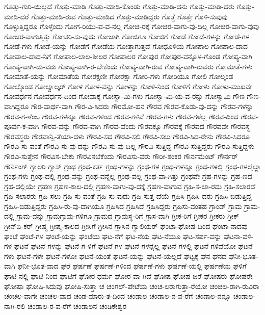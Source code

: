 {ಗೊತ್ತು-ಗುರಿ-ಯಿಲ್ಲದೆ
ಗೊತ್ತು-ಮಾಡಿ
ಗೊತ್ತು-ಮಾಡಿ-ಕೊಂಡು
ಗೊತ್ತು-ಮಾಡಿ-ದನು
ಗೊತ್ತು-ಮಾಡಿ-ದರು
ಗೊತ್ತು-ಮಾಡಿ-ದರೆ
ಗೊತ್ತು-ಮಾಡಿ-ರುವ
ಗೊತ್ತು-ಮಾಡಿದ
ಗೊತ್ತು-ಮಾಡಿದ್ದರು
ಗೊತ್ತೆ
ಗೊತ್ತೇ
ಗೊಳಿ-ಸುವುವು
ಗೊಳ್ಳುತ್ತಿದ್ದರೂ
ಗೊಳ್ಳೆಂದು
ಗೋಗ-ರಿಯು-ವ-ವ-ನಲ್ಲ
ಗೋಚ-ರಕ್ಕೆ
ಗೋಚರ-ವಾಗು-ವು-ದಿಲ್ಲ
ಗೋಚರ-ವಾಗು-ವುವು
ಗೋಚರ-ವಾಗುತ್ತಿತ್ತು
ಗೋಚರಿ-ಸು-ವುದು
ಗೋಜಾಗಿ
ಗೋಜಿಗೂ
ಗೋಜಿಗೆ
ಗೋಡೆ
ಗೋಡೆ-ಗಳನ್ನು
ಗೋಡೆ-ಗಳ
ಗೋಡೆ-ಗಳು
ಗೋಡೆ-ಯನ್ನು
ಗೋಡೆಗೆ
ಗೋಡೆಯ
ಗೋತ್ತಾಗುತ್ತದೆ
ಗೋಧೂಳಿಯ
ಗೋಪಾಲ
ಗೋಪಾಲ-ದಾದ
ಗೋಪಾಲ-ದಾದ-ನಿಗೆ
ಗೋಪಾಲ-ಲಾಲ-ಶೀಲರ
ಗೋಪಾಲರ
ಗೋಪುರ
ಗೋಪುರ-ವನ್ನೊಳ-ಗೊಂಡ
ಗೋಪ್ಯ-ವಾಗಿ
ಗೋಪ್ಯ-ವಾಗಿ-ಡು-ವರು
ಗೋಪ್ಯ-ವಾಗಿ-ರ-ಬೇಕೆಂದು
ಗೋಪ್ಯ-ವಾಗಿ-ರುವ
ಗೋಪ್ಯ-ವಾಗಿ-ರುವರು
ಗೋಮಾತೆ-ಗಳು
ಗೋಮಾತೆ-ಯನ್ನು
ಗೋಮಾತೆಯ
ಗೋರಕ್ಷಣೀ
ಗೋರಕ್ಷಾ
ಗೋರಿ-ಗಳು
ಗೋರಿಯೂ
ಗೋಲಿ
ಗೋಲ್ಕಂಡ
ಗೋಲ್ಕೊಂಡ
ಗೋಲ್ವಾಲ್ಕರ್
ಗೋಳ
ಗೋಳ-ವನ್ನು
ಗೋಳನ್ನು
ಗೋಳಿ-ನಿಂದ
ಗೋಳಿಗೆ
ಗೋಳು
ಗೋಳು-ಮುಖವೇ
ಗೋವರ್ಧನ
ಗೋವರ್ಧನ-ದಿಂದ
ಗೋವಾಕ್ಕೆ
ಗೋಸ್ವಾ-ಮಿ-ಗಳು
ಗೋಸ್ವಾ-ಮಿ-ಯ-ವ-ರನ್ನು
ಗೋಸ್ವಾಮಿ
ಗೌಣ
ಗೌಣ-ವಾಗಿದ್ದರೂ
ಗೌರ-ವಾರ್ಥ-ವಾಗಿ
ಗೌರ-ವಿ-ಸಿದರು
ಗೌರಮೋ-ಹನ
ಗೌರವ
ಗೌರವ-ಕೊಡು-ವು-ದನ್ನು
ಗೌರವ-ಗಳನ್ನು
ಗೌರವ-ಗ-ಳೆಂಬ
ಗೌರವ-ಗಳನ್ನೂ
ಗೌರವ-ಗಳಿಂದ
ಗೌರವ-ಗಳಿವೆ
ಗೌರವ-ಗಳು
ಗೌರವ-ಗಳೆಲ್ಲ
ಗೌರವ-ದಿಂದ
ಗೌರವ-ಪೂರ್ವ-ಕ-ವಾಗಿ
ಗೌರವ-ವನ್ನು
ಗೌರವ-ವಾಗಿ
ಗೌರವ-ವೆಂದು
ಗೌರವಕ್ಕೂ
ಗೌರವಕ್ಕೆ
ಗೌರವದ
ಗೌರವವೇ
ಗೌರವಸ್ಥ
ಗೌರವಸ್ಥರು
ಗೌರವಾನ್ವಿ-ತೆಯಾ-ದಳು
ಗೌರವಿ-ಸದ
ಗೌರವಿ-ಸಲಿ
ಗೌರವಿ-ಸಲು
ಗೌರವಿ-ಸಿದ-ರೇನು
ಗೌರವಿ-ಸಿದರೂ
ಗೌರವಿ-ಸು-ವಂತೆ
ಗೌರವಿ-ಸು-ವು-ದನ್ನು
ಗೌರವಿ-ಸು-ವು-ದಿಲ್ಲ
ಗೌರವಿ-ಸುತ್ತಿದ್ದ
ಗೌರವಿ-ಸುತ್ತಿದ್ದರು
ಗೌರವಿ-ಸುತ್ತಿದ್ದಳು
ಗೌರವಿ-ಸುತ್ತೇನೆ
ಗೌರವಿಸ-ಬೇಕು
ಗೌರವಿಸಬೆಕೆಂದು
ಗೌರವಿಸು-ವರು
ಗೌರೀ-ಶಂಕರ
ಗೌರ್ನಮೆಂಟ್
ಗೌರ್ನರ್
ಗೌರ್ನಿಂಗ್
ಗ್ಯಾಲರಿ
ಗ್ಯಾಸ್
ಗ್ರಂಥ
ಗ್ರಂಥ-ಕರ್ತ
ಗ್ರಂಥ-ಗಳನ್ನು
ಗ್ರಂಥ-ಗಳ
ಗ್ರಂಥ-ಗಳನ್ನೂ
ಗ್ರಂಥ-ಗಳಲ್ಲಿ
ಗ್ರಂಥ-ಗಳಲ್ಲೆಲ್ಲಾ
ಗ್ರಂಥ-ಗಳು
ಗ್ರಂಥ-ದಲ್ಲಿ
ಗ್ರಂಥ-ವನ್ನು
ಗ್ರಂಥ-ವನ್ನೆಲ್ಲ
ಗ್ರಂಥ-ವಲ್ಲ
ಗ್ರಂಥ-ವಾ-ಗಿತ್ತು
ಗ್ರಂಥವೇ
ಗ್ರಹ-ಗಳನ್ನು
ಗ್ರಹ-ಣದ
ಗ್ರಹ-ದಲ್ಲಿಯೇ
ಗ್ರಹಣ
ಗ್ರಹಣ-ಕಾಲ-ದಲ್ಲಿ
ಗ್ರಹಣ-ವಾಗು-ವು-ದಕ್ಕೆ
ಗ್ರಹಣ-ವಾಗುವ
ಗ್ರಹಿ-ಸ-ಲಾ-ರದು
ಗ್ರಹಿ-ಸಲಾರದೆ
ಗ್ರಹಿ-ಸಲಾರರು
ಗ್ರಹಿ-ಸಲು
ಗ್ರಹಿ-ಸು-ವಂತೆ
ಗ್ರಹಿ-ಸು-ವುದು
ಗ್ರಹಿ-ಸುತ್ತ-ದೆಯೆ
ಗ್ರಹಿಸಿ
ಗ್ರಹಿಸಿ-ದರು
ಗ್ರಹಿಸಿ-ಬಿಡುತ್ತಿದ್ದ
ಗ್ರಹಿಸಿ-ಬಿಡುತ್ತಿದ್ದರು
ಗ್ರಹಿಸಿ-ರು-ವು-ದಾಗಿಯೂ
ಗ್ರಹಿಸಿದ
ಗ್ರಹಿಸಿದೆ
ಗ್ರಹಿಸಿದ್ದರು
ಗ್ರಹಿಸು-ವಂತಹ
ಗ್ರಾಂಡ್
ಗ್ರಾಮ
ಗ್ರಾಮ-ದಲ್ಲಿ
ಗ್ರಾಮ-ವನ್ನು
ಗ್ರಾಮಗ್ರಾಮ-ಗಳಿಗೂ
ಗ್ರಾಮದ
ಗ್ರಾಮಸ್ಥ-ರಿಗೆ
ಗ್ರಾಸ-ವಾಗಿ
ಗ್ರೀಕ-ರಿಗೆ
ಗ್ರೀಕರ
ಗ್ರೀಕರು
ಗ್ರೀಕ್
ಗ್ರೀನ್ಏ-ಕರ್
ಗ್ರೀಷ್ಮ
ಗ್ರೀಷ್ಮ-ಕಾಲದ
ಗ್ರೀಸಿಗೆ
ಗ್ರೀಸಿನ
ಗ್ಲಾಸಿನ
ಗ್ವಾಲಿಯರ್
ಘಂಟಾ-ಘೋಷ-ದಿಂದ
ಘಂಟಾ-ನಾದವು
ಘಂಟೆ
ಘಂಟೆ-ಗಳ
ಘಂಟೆ-ಯನ್ನು
ಘಂಟೆಯ
ಘಟ-ನೆಗೆ
ಘಟ-ನೆಯ
ಘಟ-ನೆಯೂ
ಘಟ-ಸರ್ಪ-ವನ್ನು
ಘಟನಾ-ವಳಿ-ಗಳ
ಘಟನೆ
ಘಟನೆ-ಗಳನ್ನು
ಘಟನೆ-ಗ-ಳಿಗೆ
ಘಟನೆ-ಗಳ
ಘಟನೆ-ಗಳನ್ನೆಲ್ಲ
ಘಟನೆ-ಗಳಲ್ಲಿ
ಘಟನೆ-ಗಳಿವೆಯೋ
ಘಟನೆ-ಗಳು
ಘಟನೆ-ಗಳೇ
ಘಟನೆ-ಗಳೋ
ಘಟನೆ-ಯಂತೆ
ಘಟನೆ-ಯನ್ನು
ಘಟನೆ-ಯಲ್ಲದೆ
ಘಟ್ಟಕ್ಕೆ
ಘನ
ಘನದ
ಘನೀ-ಭೂತ-ವಾಗಿ
ಘನೀ-ಭೂತ-ವಾದ
ಘರೆ
ಘರ್ಷಣೆ
ಘರ್ಷಣೆ-ಗಳಿಂದ
ಘರ್ಷಣೆ-ಗಳು
ಘರ್ಷಣೆ-ಯಲ್ಲಿ
ಘರ್ಷಣೆಯ
ಘಳಿಗೆ
ಘಾಟಿ-ನಲ್ಲಿ
ಘಾಟಿ-ನಿಂದ
ಘಾಟಿಗೆ
ಘೋರ-ಧರ್ಮ
ಘೋರ-ವಾ-ಗಿದೆ
ಘೋಷ
ಘೋಷ-ಜರೆ
ಘೋಷರು
ಘೋಷರೇ
ಘೋಷಾ
ಘೋಷಿ-ಸಿದುವು
ಘೋಷಿ-ಸುತ್ತಾ
ಚ
ಚಂಗಲ್-ಪೇಟೆಯ
ಚಂಚ-ಲರಾಗುತ್ತಾ-ರೆಯೋ
ಚಂಚಲ-ರಾಗಿ-ರುವಿರಾ
ಚಂಚಲ-ವಾಗೇ
ಚಂಚಲ-ವಾದ
ಚಂಡ-ಮಾರು-ತ-ದಿಂದ
ಚಂಡಾಲ
ಚಂಡಾಲ-ನ-ವ-ರೆಗೆ
ಚಂಡಾಲ-ನನ್ನೂ
ಚಂಡಾಲ-ನಾಗಿ-ರಲಿ
ಚಂಡಾಲ-ರ-ವ-ರೆಗೆ
ಚಂಡಾಲನ
ಚಂಡಿಕೇಶ್ವರ
}
